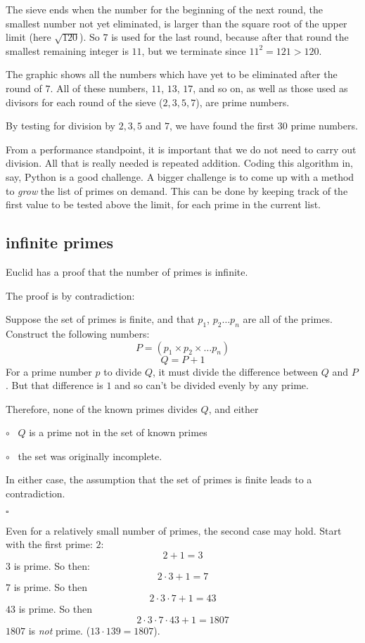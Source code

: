 \documentclass[11pt, oneside]{article}
\begin{document}
The sieve ends when the number for the beginning of the next round, the smallest number not yet eliminated, is larger than the square root of the upper limit (here $\sqrt{120}$).  So $7$ is used for the last round, because after that round the smallest remaining integer is $11$, but we terminate since $11^2 = 121 > 120$.

The graphic shows all the numbers which have yet to be eliminated after the round of $7$.   All of these numbers, $11$, $13$, $17$, and so on, as well as those used as divisors for each round of the sieve ($2, 3, 5, 7$), are prime numbers.

By testing for division by $2, 3, 5$ and $7$, we have found the first $30$ prime numbers.

From a performance standpoint, it is important that we do not need to carry out division.  All that is really needed is repeated addition.  Coding this algorithm in, say, Python is a good challenge.  A bigger challenge is to come up with a method to \emph{grow} the list of primes on demand.  This can be done by keeping track of the first value to be tested above the limit, for each prime in the current list.

\subsection*{infinite primes}

Euclid has a proof that the number of primes is infinite.

The proof is by contradiction:

Suppose the set of primes is finite, and that $p_1$, $p_2 \dots p_n$ are all of the primes.  Construct the following numbers:
\[ P = (p_1 \times p_2 \times \dots p_n)  \]
\[ Q = P + 1 \]
For a prime number $p$ to divide $Q$, it must divide the difference between $Q$ and $P$.  But that difference is $1$ and so can't be divided evenly by any prime.

Therefore, none of the known primes divides $Q$, and either

$\circ$ \  $Q$ is a prime not in the set of known primes

$\circ$ \ the set was originally incomplete.

In either case, the assumption that the set of primes is finite leads to a contradiction.

$\square$

Even for a relatively small number of primes, the second case may hold.  Start with the first prime:  $2$:
\[ 2 + 1 = 3 \]
$3$ is prime.  So then:
\[ 2 \cdot 3 + 1 = 7 \]
$7$ is prime.  So then
\[ 2 \cdot 3 \cdot 7 +1 = 43 \]
$43$ is prime.  So then
\[ 2 \cdot 3 \cdot 7 \cdot 43 + 1 =  1807 \]
$1807$ is \emph{not} prime.  ($13 \cdot 139 = 1807$).
\end{document}
